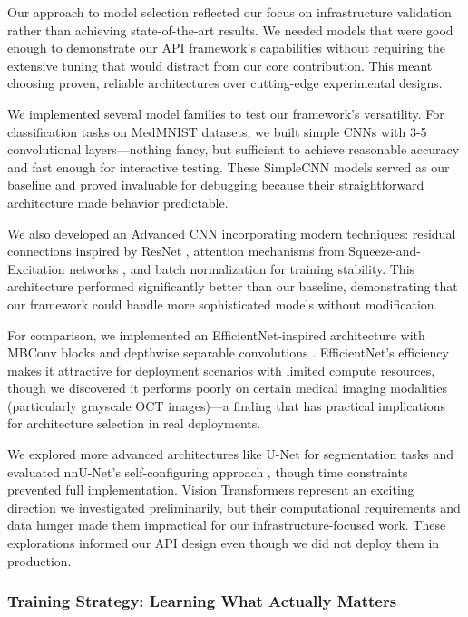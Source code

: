 \documentclass[12pt,a4paper]{article}
\begin{document}
Our approach to model selection reflected our focus on infrastructure validation rather than achieving state-of-the-art results. We needed models that were good enough to demonstrate our API framework's capabilities without requiring the extensive tuning that would distract from our core contribution. This meant choosing proven, reliable architectures over cutting-edge experimental designs.

We implemented several model families to test our framework's versatility. For classification tasks on MedMNIST datasets, we built simple CNNs with 3-5 convolutional layers—nothing fancy, but sufficient to achieve reasonable accuracy and fast enough for interactive testing. These SimpleCNN models served as our baseline and proved invaluable for debugging because their straightforward architecture made behavior predictable.

We also developed an Advanced CNN incorporating modern techniques: residual connections inspired by ResNet \cite{he2016deep}, attention mechanisms from Squeeze-and-Excitation networks \cite{hu2018squeeze}, and batch normalization for training stability. This architecture performed significantly better than our baseline, demonstrating that our framework could handle more sophisticated models without modification.

For comparison, we implemented an EfficientNet-inspired architecture with MBConv blocks and depthwise separable convolutions \cite{tan2019efficientnet}. EfficientNet's efficiency makes it attractive for deployment scenarios with limited compute resources, though we discovered it performs poorly on certain medical imaging modalities (particularly grayscale OCT images)—a finding that has practical implications for architecture selection in real deployments.

We explored more advanced architectures like U-Net for segmentation tasks and evaluated nnU-Net's self-configuring approach \cite{isensee2021nnunet}, though time constraints prevented full implementation. Vision Transformers represent an exciting direction we investigated preliminarily, but their computational requirements and data hunger made them impractical for our infrastructure-focused work. These explorations informed our API design even though we did not deploy them in production.

\subsubsection{Training Strategy: Learning What Actually Matters}
\end{document}
